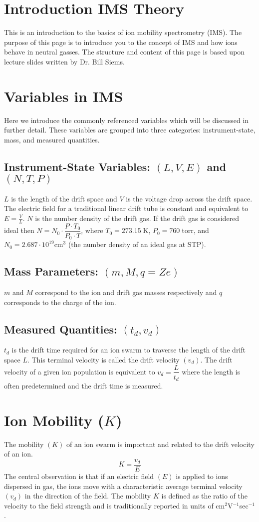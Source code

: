 \documentclass[10pt,a4paper,final]{article}
\begin{document}
\section{Introduction IMS Theory}
This is an introduction to the basics of ion mobility spectrometry (IMS). The purpose of this page is to introduce you to the concept of IMS and how ions behave in neutral gasses. The structure and content of this page is based upon lecture slides written by Dr. Bill Siems.
\section{Variables in IMS}
Here we introduce the commonly referenced variables which will be discussed in further detail. These variables are grouped into three categories: instrument-state, mass, and measured quantities.
\subsection{Instrument-State Variables: $(L, V, E)$ and $(N, T, P)$}
$L$ is the length of the drift space and $V$ is the voltage drop across the drift space. The electric field for a traditional linear drift tube is constant and equivalent to $E=\frac{V}{L}$. $N$ is the number density of the drift gas. If the drift gas is considered ideal then $N=N_0\cdot \dfrac{P\cdot T_0}{P_0\cdot T}$, where $T_0=273.15\;$K, $P_0= 760\;$torr, and  $N_0=2.687\cdot10^{19} \text{cm}^3$ (the number density of an ideal gas at STP).
\subsection{Mass Parameters: $(m, M, q=Ze)$}
$m$ and $M$ correspond to the ion and drift gas masses respectively and $q$ corresponds to the charge of the ion.
\subsection{Measured Quantities: $(t_d, v_d)$}
$t_d$ is the drift time required for an ion swarm to traverse the length of the drift space $L$. This terminal velocity is called the drift velocity $(v_d)$. The drift velocity of a given ion population is equivalent to $v_d=\dfrac{L}{t_d}$ where the length is often predetermined and the drift time is measured.
\section{Ion Mobility ($K$)}
The mobility $(K)$ of an ion swarm is important and related to the drift velocity of an ion.
\begin{equation}
K=\frac{v_d}{E}
\end{equation}
The central observation is that if an electric field $(E)$ is applied to ions dispersed in gas, the ions move with a characteristic average terminal velocity $(v_d)$ in the direction of the field. The mobility $K$ is defined as the ratio of the velocity to the field strength and is traditionally reported in units of cm$^2$V$^{-1}$sec$^{-1}$.
\end{document}
